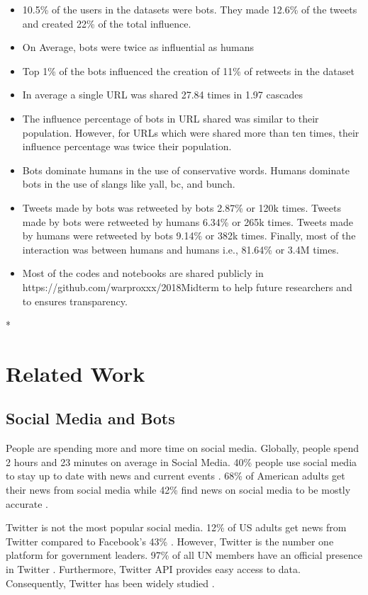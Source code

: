 \documentclass[letterpaper]{article}
\begin{document}
\begin{itemize}
    \item 10.5\% of the users in the datasets were bots. They made 12.6\% of the tweets and created 22\% of the total influence.
    \item On Average, bots were twice as influential as humans
    \item Top 1\% of the bots influenced the creation of 11\% of retweets in the dataset
    \item In average a single URL was shared 27.84 times in 1.97 cascades
    \item The influence percentage of bots in URL shared was similar to their population. However, for URLs which were shared more than ten times, their influence percentage was twice their population.
    \item Bots dominate humans in the use of conservative words. Humans dominate bots in the use of slangs like yall, bc, and bunch.
    \item Tweets made by bots was retweeted by bots 2.87\% or 120k times. Tweets made by bots were retweeted 
    by humans 6.34\% or 265k times. Tweets made by humans were retweeted by bots 9.14\% or 382k times. Finally, most of the interaction was between humans and humans i.e., 81.64\% or 
    3.4M times.
    \item Most of the codes and notebooks are shared publicly in https://github.com/warproxxx/2018Midterm to help future researchers and to ensures transparency.
\end{itemize}

    

*
\section{Related Work}
\label{sec:related}

\subsection{Social Media and Bots}
People are spending more and more time on social media. Globally, people spend 2 hours and 23 minutes on average in Social Media. 40\%  people use social media to stay up to date 
with news and current events \cite{2019_social_flagship_report}. 68\% of American adults get their news from
social media while 42\% find news on social media to be mostly accurate \cite{pew_research_news}.\par

Twitter is not the most popular social media. 12\% of US adults get news from Twitter compared to Facebook's 43\% \cite{pew_research_news}. However, 
Twitter is the number one platform for government leaders. 97\% of all UN members have an official presence in Twitter \cite{twiplomacy}. Furthermore, Twitter API provides easy access to data.
Consequently, Twitter has been widely studied \cite{rizoiu2018debatenight,grinberg2019fake,bovet2019influence,morstatter2018alt,munger2017don,gruzd2014investigating,zannettou2019characterizing,howard2016bots}.
\par
\end{document}
